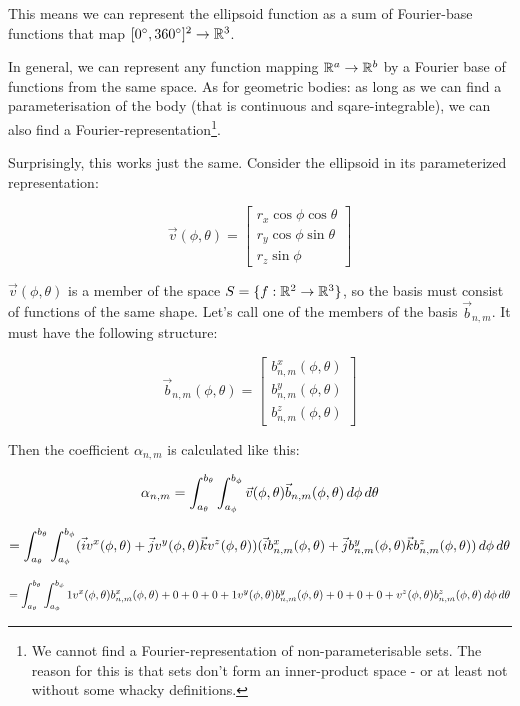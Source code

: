 This means we can represent the ellipsoid function as a sum of Fourier-base functions that map $[0\degree, 360\degree]^2 \to \mathbb{R}^3$.

In general, we can represent any function mapping $\mathbb{R}^a \to \mathbb{R}^b$ by a Fourier base of functions from the same space. As for geometric bodies: as long as we can find a parameterisation of the body (that is continuous and sqare-integrable), we can also find a Fourier-representation\footnote{We cannot find a Fourier-representation of non-parameterisable sets. The reason for this is that sets don't form an inner-product space - or at least not without some whacky definitions.}. 

Surprisingly, this works just the same. Consider the ellipsoid in its parameterized representation: 

$$ \vec{v}(\phi, \theta) = 
\begin{bmatrix} 
    r_x \cos{\phi} \cos{\theta} \\
    r_y \cos{\phi} \sin{\theta} \\
    r_z \sin{\phi}
\end{bmatrix}  $$

$\vec{v}(\phi, \theta)$ is a member of the space $S = \{f: \mathbb{R}^2 \to \mathbb{R}^3\}$, so the basis must consist of functions of the same shape. Let's call one of the members of the basis $\vec{b}_{n,m}$. It must have the following structure: 

$$
\vec{b}_{n,m}(\phi, \theta) = 
\begin{bmatrix}
    b_{n,m}^x(\phi, \theta) \\
    b_{n,m}^y(\phi, \theta) \\
    b_{n,m}^z(\phi, \theta)
\end{bmatrix}
$$

Then the coefficient $\alpha_{n,m}$ is calculated like this: 

$$ \alpha_{n,m} = \int_{a_\theta}^{b_\theta} \int_{a_\phi}^{b_\phi} \vec{v}(\phi, \theta) \vec{b}_{n,m}(\phi, \theta) \mathop{d\phi} \mathop{d\theta} $$

$$ = \int_{a_\theta}^{b_\theta} \int_{a_\phi}^{b_\phi} (\vec{i} v^x(\phi, \theta) + \vec{j} v^y(\phi, \theta) \vec{k} v^z(\phi, \theta)) (\vec{i} b_{n,m}^x(\phi, \theta) + \vec{j} b_{n,m}^y(\phi, \theta) \vec{k} b_{n,m}^z(\phi, \theta)) \mathop{d\phi} \mathop{d\theta} $$

$$ = \int_{a_\theta}^{b_\theta} \int_{a_\phi}^{b_\phi} 1 v^x(\phi, \theta) b_{n,m}^x(\phi, \theta) + 0 + 0 + 0 + 1 v^y(\phi, \theta) b_{n,m}^y(\phi, \theta) + 0 + 0 + 0 + v^z(\phi, \theta) b_{n,m}^z(\phi, \theta) \mathop{d\phi} \mathop{d\theta} $$


